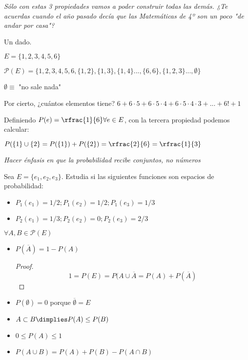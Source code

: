 \textit{Sólo con estas 3 propiedades vamos a poder construir todas las demás. ¿Te acuerdas cuando el año pasado decía que las Matem\'aticas de 4º son un poco "de andar por casa"?}

\begin{example} Un dado. 

$E = \{1,2,3,4,5,6\}$

$\mathcal{P}(E) = \{1,2,3,4,5,6,\{1,2\},\{1,3\},\{1,4\} ... , \{6,6\},\{1,2,3\} ..., \emptyset \}$

$\emptyset \equiv$ "no sale nada"

Por cierto, ¿cuántos elementos tiene? $6+6·5+6·5·4+6·5·4·3+... + 6!+1$

Definiendo $P(e) = \rfrac{1}{6} \forall e\in E$, con la tercera propiedad podemos calcular:

$P(\{1\} \cup \{2\} = P(\{1\}) + P(\{2\}) = \rfrac{2}{6} = \rfrac{1}{3}$

\textit{Hacer énfasis en que la probabilidad recibe conjuntos, no números}\end{example}

\begin{example}
Sea $E=\{e_1,e_2,e_3\}$. Estudia si las siguientes funciones son espacios de probabilidad:

\begin{itemize}
	\item $P_1(e_1) = 1/2 ; P_1(e_2) = 1/2 ; P_1(e_3) = 1/3$
	\item $P_2(e_1) = 1/3 ; P_2(e_2) = 0 ; P_2(e_3) = 2/3$
\end{itemize}
\end{example}

\begin{prop}
$\forall A,B \in \mathcal{P}(E)$
\begin{itemize}
	\item $P(\overline{A}) = 1 - P(A)$
	\begin{proof}
		\[1=P(E) = P(A\cup\overline{A} = P(A) + P(\overline{A})\]
	\end{proof}
	\item $P(\emptyset) = 0$ porque $\overline{\emptyset} = E$
	\item $A\subset B \dimplies P(A) \leq P(B)$
	\item $0\leq P(A)\leq 1$
	\item $P(A\cup B) = P(A) + P(B) - P(A\cap B)$
\end{itemize}
\end{prop}


